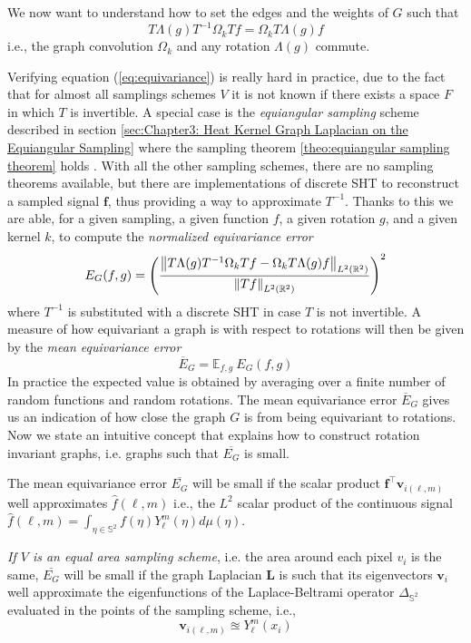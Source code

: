 We now want to understand how to set the edges and the weights of $G$ such that
\begin{equation}\label{eq:equivariance}
T \Lambda(g) T^{-1} \Omega_k T f = \Omega_k T \Lambda(g) f
\end{equation}
i.e., the graph convolution $\Omega_k$ and any rotation $\Lambda(g)$ commute.

Verifying equation (\ref{eq:equivariance}) is really hard in practice, due to the fact that for almost all samplings schemes $V$ it is not known if there exists a space $F$ in which $T$ is invertible. A special case is the \textit{equiangular sampling} scheme described in section \ref{sec:Chapter3: Heat Kernel Graph Laplacian on the Equiangular Sampling} where the sampling theorem \ref{theo:equiangular sampling theorem} holds \cite{Driscoll:1994:CFT:184069.184073}. With all the other sampling schemes, there are no sampling theorems available, but there are implementations of discrete SHT to reconstruct a sampled signal $\mathbf f$, thus providing a way to approximate $T^{-1}$. Thanks to this we are able, for a given sampling, a given function $f$, a given rotation $g$, and a given kernel $k$, to compute the \textit{normalized equivariance error} 
\begin{equation}\label{eq:equivariance error}
E_{G}(f, g) = \left(\frac{ \left\lVert T \Lambda(g) T^{-1} \Omega_k Tf - \Omega_k T \Lambda(g) f\right\rVert_{L^2(\mathbb R^2)}}{\left\lVert Tf\right\rVert_{L^2(\mathbb R^2)}}\right)^2
\end{equation}
where $T^{-1}$ is substituted with a discrete SHT in case $T$ is not invertible.
A measure of how equivariant a graph is with respect to rotations will then be given by the \textit{mean equivariance error}
\begin{equation}\label{eq:mean equivariance error}
\overline E_G = \mathbb E_{f, g}\ 	E_G(f, g) 
\end{equation}
In practice the expected value is obtained by averaging over a finite number of random functions and random rotations. The mean equivariance error $\overline E_G$ gives us an indication of how close the graph $G$ is from being equivariant to rotations. Now we state an intuitive concept that explains how to construct rotation invariant graphs, i.e. graphs such that $\overline{E_G}$ is small.
\begin{snugshade*}
	The mean equivariance error $\overline{E_G}$ will be small if the scalar product $\mathbf f^\intercal \mathbf v_{i(\ell, m)}$ well approximates $\hat {f}(\ell,m)$ i.e., the $L^2$ scalar product of the continuous signal \\
	$\hat {f}(\ell,m)= \int_{\eta \in \mathbb S^2}f(\eta)Y_\ell^m(\eta)d\mu(\eta)$.
	
	\textit{If $V$ is an equal area sampling scheme}, i.e. the area around each pixel $v_i$ is the same, $\overline{E_G}$ will be small if the graph Laplacian $\mathbf L$ is such that its eigenvectors $\mathbf v_i$ well approximate the eigenfunctions of the Laplace-Beltrami operator $\Delta_{\mathbb S^2}$ evaluated in the points of the sampling scheme, i.e., 
	$$
	\mathbf v_{i(\ell, m)} \approxeq Y_\ell^m(x_i)
	$$
\end{snugshade*}

